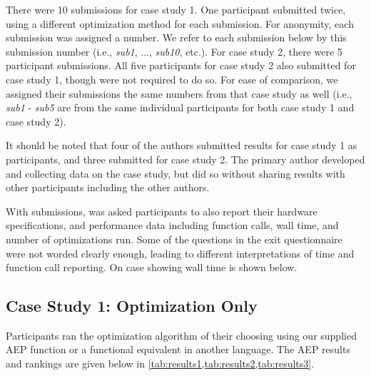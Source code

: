 
    There were 10 submissions for case study 1.
	One participant submitted twice, using a different optimization method for each submission.
	For anonymity, each submission was assigned a number.
	We refer to each submission below by this submission number (i.e., \textit{sub1}, ..., \textit{sub10}, etc.).
	For case study 2, there were 5 participant submissions.
	All five participants for case study 2 also submitted for case study 1, though were not required to do so.
	For ease of comparison, we assigned their submissions the same numbers from that case study as well
	(i.e., \textit{sub1} - \textit{sub5} are from the same individual participants for both case study 1 and case study 2).
	
	It should be noted that four of the authors submitted results for case study 1 as participants, and three submitted for case study 2.  The primary author developed and collecting data on the case study, but did so without sharing results with other participants including the other authors.  
	
	
	With submissions, was asked participants to also report their hardware specifications, and  performance data including function calls, wall time, and number of optimizations run.  Some of the questions in the exit questionnaire were not worded clearly enough, leading to different interpretations of time and function call reporting.  On case showing wall time is shown below.

\subsection{Case Study 1: Optimization Only}\label{sec:res-optonly}

	Participants ran the optimization algorithm of their choosing using our supplied AEP function or a functional equivalent in another language.
	The AEP results and rankings are given below in \cref{tab:results1,tab:results2,tab:results3}.

